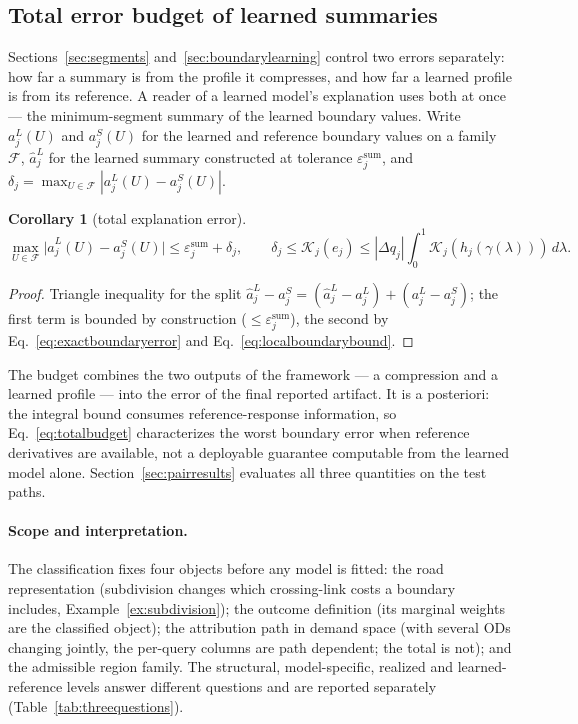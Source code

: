 \documentclass[a4paper,fleqn]{cas-sc}
\newtheorem{corollary}[theorem]{Corollary}
\begin{document}
\subsection{Total error budget of learned summaries}\label{sec:totalbudget}
Sections~\ref{sec:segments} and~\ref{sec:boundarylearning} control two
errors separately: how far a summary is from the profile it compresses,
and how far a learned profile is from its reference. A reader of a
learned model's explanation uses both at once --- the minimum-segment
summary of the learned boundary values. Write $a_j^L(U)$ and $a_j^S(U)$ for
the learned and reference boundary values on a family $\mathcal F$,
$\hat a_j^L$ for the learned summary constructed at tolerance
$\varepsilon^{\mathrm{sum}}_j$, and
$\delta_j=\max_{U\in\mathcal F}|a_j^L(U)-a_j^S(U)|$.
\begin{corollary}[total explanation error]\label{cor:totalbudget}
\begin{equation}
\max_{U\in\mathcal F}\bigl|\hat a_j^L(U)-a_j^S(U)\bigr|
\le\varepsilon^{\mathrm{sum}}_j+\delta_j,
\qquad
\delta_j\le\mathcal K_j(e_j)\le|\Delta q_j|\int_0^1\mathcal K_j(h_j(\gamma(\lambda)))\,d\lambda.
\label{eq:totalbudget}
\end{equation}
\end{corollary}
\begin{proof}
Triangle inequality for the split
$\hat a_j^L-a_j^S=(\hat a_j^L-a_j^L)+(a_j^L-a_j^S)$; the first term is
bounded by construction ($\le\varepsilon^{\mathrm{sum}}_j$), the second by
Eq.~\eqref{eq:exactboundaryerror} and Eq.~\eqref{eq:localboundarybound}.
\end{proof}
The budget combines the two outputs of the framework --- a
compression and a learned profile --- into the error of the final
reported artifact. It is a posteriori: the integral bound consumes
reference-response information, so Eq.~\eqref{eq:totalbudget}
characterizes the worst boundary error when reference derivatives are
available, not a deployable guarantee computable from the learned model
alone. Section~\ref{sec:pairresults} evaluates all three quantities on
the test paths.

\paragraph{Scope and interpretation.}\label{sec:noninheritance}
The classification fixes four objects before any model is fitted: the
road representation (subdivision changes which crossing-link costs a
boundary includes, Example~\ref{ex:subdivision}); the outcome
definition (its marginal weights are the classified object); the
attribution path in demand space (with several ODs changing jointly,
the per-query columns are path dependent; the total is not); and the
admissible region family. The structural, model-specific, realized and
learned-reference levels answer different questions and are reported
separately (Table~\ref{tab:threequestions}).
\end{document}
